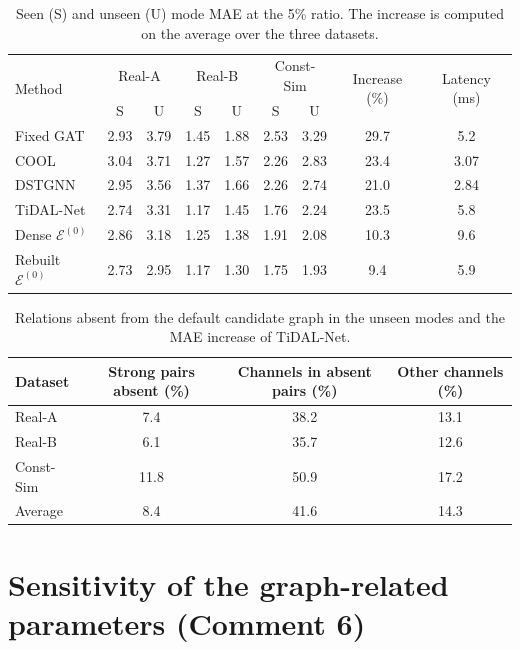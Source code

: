 \documentclass[10pt,a4paper]{article}
\begin{document}
\begin{table}[!htbp]
\centering
\caption{Seen (S) and unseen (U) mode MAE at the 5\% ratio. The increase is computed on the average over the three datasets.}
\label{tab:s11}
\small
\begin{tabular}{lcccccccc}
\toprule
\multirow{2}{*}{Method} & \multicolumn{2}{c}{Real-A} & \multicolumn{2}{c}{Real-B} & \multicolumn{2}{c}{Const-Sim} & \multirow{2}{*}{Increase (\%)} & \multirow{2}{*}{Latency (ms)} \\
& S & U & S & U & S & U & & \\
\midrule
Fixed GAT & 2.93 & 3.79 & 1.45 & 1.88 & 2.53 & 3.29 & 29.7 & 5.2 \\
COOL & 3.04 & 3.71 & 1.27 & 1.57 & 2.26 & 2.83 & 23.4 & 3.07 \\
DSTGNN & 2.95 & 3.56 & 1.37 & 1.66 & 2.26 & 2.74 & 21.0 & 2.84 \\
TiDAL-Net & 2.74 & 3.31 & 1.17 & 1.45 & 1.76 & 2.24 & 23.5 & 5.8 \\
Dense $\mathcal E^{(0)}$ & 2.86 & 3.18 & 1.25 & 1.38 & 1.91 & 2.08 & 10.3 & 9.6 \\
Rebuilt $\mathcal E^{(0)}$ & 2.73 & 2.95 & 1.17 & 1.30 & 1.75 & 1.93 & 9.4 & 5.9 \\
\bottomrule
\end{tabular}
\end{table}

\begin{table}[!htbp]
\centering
\caption{Relations absent from the default candidate graph in the unseen modes and the MAE increase of TiDAL-Net.}
\label{tab:s12}
\small
\begin{tabular}{lccc}
\toprule
Dataset & Strong pairs absent (\%) & Channels in absent pairs (\%) & Other channels (\%) \\
\midrule
Real-A & 7.4 & 38.2 & 13.1 \\
Real-B & 6.1 & 35.7 & 12.6 \\
Const-Sim & 11.8 & 50.9 & 17.2 \\
Average & 8.4 & 41.6 & 14.3 \\
\bottomrule
\end{tabular}
\end{table}

\clearpage
\section{Sensitivity of the graph-related parameters (Comment 6)}
\label{sec:sens}
\end{document}
